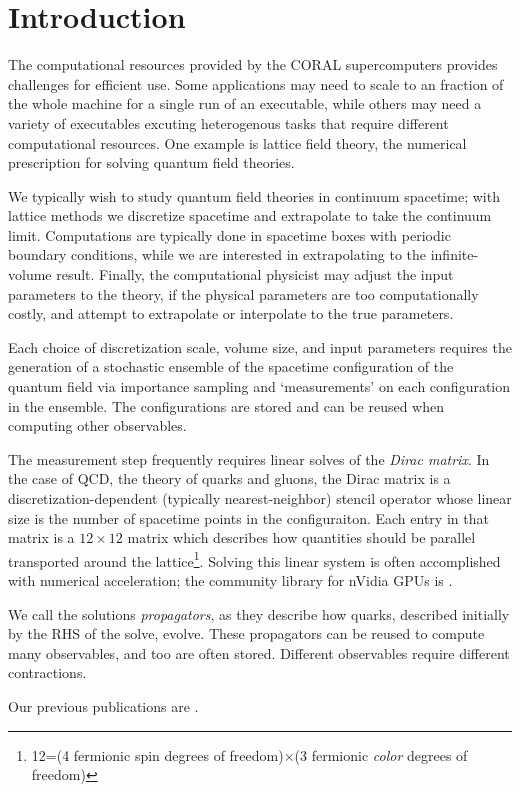 \section{Introduction}

The computational resources provided by the CORAL supercomputers provides challenges for efficient use.
Some applications may need to scale to an  fraction of the whole machine for a single run of an executable, while others may need a variety of executables excuting heterogenous tasks that require different computational resources.  One example is lattice field theory, the numerical prescription for solving quantum field theories.

We typically wish to study quantum field theories in continuum spacetime; with lattice methods we discretize spacetime and extrapolate to take the continuum limit.
Computations are typically done in spacetime boxes with periodic boundary conditions, while we are interested in extrapolating to the infinite-volume result.
Finally, the computational physicist may adjust the input parameters to the theory, if the physical parameters are too computationally costly, and attempt to extrapolate or interpolate to the true parameters.

Each choice of discretization scale, volume size, and input parameters requires the generation of a stochastic ensemble of the spacetime configuration of the quantum field via importance sampling and `measurements' on each configuration in the ensemble.
The configurations are stored and can be reused when computing other observables.

The measurement step frequently requires linear solves of the \emph{Dirac matrix}.
In the case of QCD, the theory of quarks and gluons, the Dirac matrix is a discretization-dependent (typically nearest-neighbor) stencil operator whose linear size is the number of spacetime points in the configuraiton.
Each entry in that matrix is a $12\times12$ matrix which describes how quantities should be parallel transported around the lattice\footnote{12=(4 fermionic spin degrees of freedom)$\times$(3 fermionic \emph{color} degrees of freedom)}.
Solving this linear system is often accomplished with numerical acceleration; the community library for nVidia GPUs is \quda\cite{Clark:2009wm,Babich:2011np}.

We call the solutions \emph{propagators}, as they describe how quarks, described initially by the RHS of the solve, evolve.
These propagators can be reused to compute many observables, and too are often stored.
Different observables require different contractions.


Our previous publications are \cite{Berkowitz:2017vcp,Berkowitz:2017xna}.
